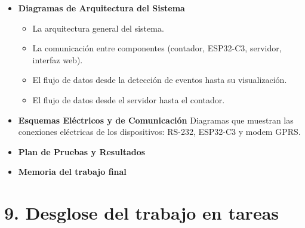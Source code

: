 \documentclass[
11pt, %
]{charter}
\begin{document}
\begin{itemize}
\item \textbf{Diagramas de Arquitectura del Sistema}
\begin{itemize}
\item La arquitectura general del sistema.
\item La comunicación entre componentes (contador, ESP32-C3, servidor, interfaz web).
\item El flujo de datos desde la detección de eventos hasta su visualización.
\item El flujo de datos desde el servidor hasta el contador.
\end{itemize}

\item \textbf{Esquemas Eléctricos y de Comunicación}
Diagramas que muestran las conexiones eléctricas de los dispositivos: RS-232, ESP32-C3 y modem GPRS.
\item \textbf{Plan de Pruebas y Resultados}
\item \textbf{Memoria del trabajo final}

\end{itemize}


\section{9. Desglose del trabajo en tareas}
\label{sec:wbs}
\end{document}
